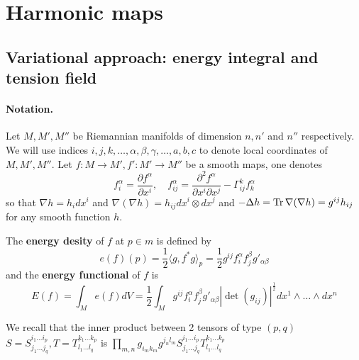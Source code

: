 \section{Harmonic maps}
\label{sec:org8951e74}
\subsection{Variational approach: energy integral and tension field}
\label{sec:org782d12c}
\paragraph{Notation.}
\label{sec:org2e4faab}
Let \(M, M', M''\) be Riemannian manifolds of dimension \(n, n'\) and \(n''\)
respectively. We will use indices \(i,j,k,\dots, \alpha,\beta,\gamma,\dots, a,b,c\) to denote local
coordinates of \(M, M', M''\).
Let \(f: M \longrightarrow M', f': M' \longrightarrow M''\) be a smooth maps, one denotes
\[
f^\alpha_i = \frac{\partial f^\alpha}{\partial x^i},\quad f^\alpha_{ij} =
\frac{\partial^2 f^\alpha}{\partial x^i \partial x^j} - \Gamma_{ij}^k f^{\alpha}_k \]
so that \(\nabla h = h_i dx^i\) and \(\nabla (\nabla h) = h_{ij}dx^i\otimes dx^j\) and
\(-\Delta h = \mathop{\rm Tr}\nolimits \nabla (\nabla h) = g^{ij}h_{ij}\) for any smooth function \(h\).


\begin{definition}
The \textbf{energy desity} of \(f\) at \(p\in m\) is defined by
\[
e(f)(p) = \frac{1}{2}\langle g, f^*g \rangle_p = \frac{1}{2}g^{ij}f^\alpha_i
f^\beta_j g'_{\alpha\beta}
\]
and the \textbf{energy functional} of \(f\) is
\[
E(f) = \int_M e(f) dV = \frac{1}{2}\int_M g^{ij}f^\alpha_i
f^\beta_j g'_{\alpha\beta} |\det (g_{ij})|^\frac{1}{2} dx^1\wedge \dots\wedge dx^n
\]
\end{definition}

We recall that the inner product between 2 tensors of type \((p,q)\) \(S =
S^{i_1\dots i_p}_{j_1\dots j_q}, T = T^{k_1\dots k_p}_{l_1\dots l_q}\) is \(\prod_{m,n}
g_{i_m k_m} g^{j_n l_m}S^{i_1\dots i_p}_{j_1\dots j_q} T^{k_1\dots k_p}_{l_1\dots l_q}\)

